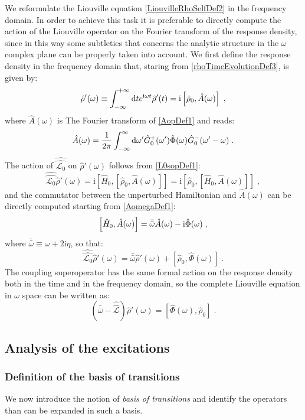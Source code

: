 \documentclass[a4paper]{article}
\newcommand{\dd}{{\rm d}}
\newcommand{\bbomega}{{\bar{\bar\omega}}}
\newcommand{\ii}{\mathrm{i}}
\newcommand{\intover}[1]{\int_{-\infty}^{+\infty} \dd {#1}}
\newcommand{\be}{\begin{equation}}
\newcommand{\ee}{\end{equation}}
\newcommand{\nn}{\notag}
\newcommand{\lb}{\label}
\newcommand{\op}[1]{\hat {#1}}
\newcommand{\sop}[1]{\op{\op {#1}}}
\newcommand{\commutator}[2]{\left[ {#1} , {#2} \right]}
\newcommand{\dmnot}{\op{\rho}_0}
\newcommand{\dm}{\op{\rho}}
\newcommand{\hnot}{\op{H}_0}
\newcommand{\Liouv}{\sop{\mathcal L}}
\newcommand{\Liouvnot}{\sop{\mathcal L_0}}
\begin{document}
We reformulate the Liouville equation \eqref{LiouvilleRhoSelfDef2} in the frequency domain. In order to achieve this task it is
preferable to directly compute the action of the Liouville operator on the Fourier transform of the response density, since in this
way some subtleties that concerns the analytic structure in the $\omega$ complex plane can be properly taken into account.
We first define the response density in the frequency domain that, staring from \eqref{rhoTimeEvolutionDef3}, is given by:
\be\lb{rhoPrimeOmegaDef1}
\dm'(\omega) \equiv \intover{t} e^{\ii \omega t} \dm'(t)
= \ii \commutator{\dmnot}{\op A(\omega)} \;,
\ee
where $\op A(\omega)$ is The Fourier transform of \eqref{AopDef1} and reads:
\be \lb{AomegaDef1}
\op A(\omega) = \frac{1}{2\pi} \int_{-\infty}^\infty  \dd \omega'
\op G_0^+(\omega') \op \Phi(\omega) \op G_0^-(\omega'-\omega)\;.
\ee
The action of $\Liouvnot$ on $\dm'(\omega)$ follows from \eqref{L0sopDef1}:
\be\lb{LiouvillianRho'omegaDef1}
\Liouvnot \dm'(\omega) = \ii \commutator{\hnot}{\commutator{\dmnot}{\op A(\omega)}} = 
\ii \commutator{\dmnot}{\commutator{\hnot}{\op A(\omega)}} \;,
\ee
and the commutator between the unperturbed Hamiltonian and $\op A(\omega)$ can be directly computed starting from \eqref{AomegaDef1}: 
\be
\commutator{\hnot }{\op A(\omega)} = \bbomega \op A(\omega) - \ii \op \Phi(\omega)\;, \nn
\ee
where $\bbomega \equiv \omega + 2\ii\eta$, so that:
\be\lb{LiouvillianRho'omegaDef2}
\Liouvnot \dm'(\omega) =  \bbomega\dm'(\omega) + \commutator{\dmnot}{\op\Phi(\omega)}\;.
\ee
The coupling superoperator has the same formal action on the response density both in the time and in the frequency domain, so the complete
Liouville equation in $\omega$ space can be written as:
\be\lb{LiouvillianRho'omegaDef3}
\left(\bbomega - \Liouv\right) \dm'(\omega) =  \commutator{\op\Phi(\omega)}{\dmnot}\;.
\ee

\subsection{Analysis of the excitations}

\subsubsection{Definition of the basis of transitions}

We now introduce the notion of \emph{basis of transitions} and identify the operators than can be expanded in such a basis. 
\end{document}
